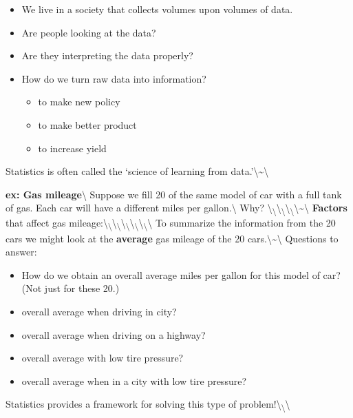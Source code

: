 \documentclass[]{book}
\begin{document}
\begin{itemize}
\item   We live in a society that collects volumes upon volumes of data.  
\item Are people looking at the data? 
\item   Are they interpreting the data properly?  
\item How do we turn raw data into information?
\begin{itemize}
\item   to make new policy
\item   to make better product
\item to increase yield
\end{itemize}
\end{itemize}

Statistics is often called the `science of learning from
data.'\textbackslash{}\textasciitilde{}\textbackslash{}

\newpage

\textbf{ex: Gas mileage}\textbackslash{} Suppose we fill 20 of the same
model of car with a full tank of gas. Each car will have a different
miles per gallon.\textbackslash{} Why?
\textbackslash{}\textsubscript{\textbackslash{}}\textbackslash{}\textsubscript{\textbackslash{}}\textbackslash{}\textsubscript{\textbackslash{}}\textbackslash{}\textasciitilde{}\textbackslash{}
\textbf{Factors} that affect gas
mileage:\textbackslash{}\textsubscript{\textbackslash{}}\textbackslash{}\textsubscript{\textbackslash{}}\textbackslash{}\textsubscript{\textbackslash{}}\textbackslash{}\textsubscript{\textbackslash{}}\textbackslash{}\textsubscript{\textbackslash{}}\textbackslash{}
To summarize the information from the 20 cars we might look at the
\textbf{average} gas mileage of the 20
cars.\textbackslash{}\textasciitilde{}\textbackslash{} Questions to
answer:

\begin{itemize}
\item How do we obtain an overall average miles per gallon for this model of car?  (Not just for these 20.)
\item   overall average when driving in city?
\item overall average when driving on a highway?
\item overall average with low tire pressure?
\item overall average when in a city with low tire pressure?
\end{itemize}

Statistics provides a framework for solving this type of
problem!\textbackslash{}\textsubscript{\textbackslash{}}\textbackslash{}
\end{document}
